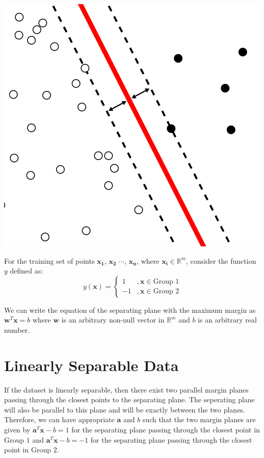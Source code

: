 \documentclass[12 pt]{report}
\begin{document}
    \includegraphics[scale = 1.2]{margin.png}

    For the training set of points $\bm{x_{1}}$, $\bm{x_{2}}$ $\cdots$, $\bm{x_{n}}$, where $\bm{x_{i}} \in \mathbb{R}^{m}$, consider the function 
    $y$ defined as:
    \begin{equation}
        y(\bm{x}) = \begin{cases}
            1 &, \bm{x} \in \text{Group 1} \\
            -1 &, \bm{x} \in \text{Group 2}
        \end{cases}
    \end{equation}

    We can write the equation of the separating plane with the maximum margin as $\bm{w}^{T}\bm{x} = b$ where $\bm{w}$ is an arbitrary non-null vector in 
    $\mathbb{R}^{m}$ and $b$ is an arbitrary real number.

    \section{Linearly Separable Data}
    If the dataset is linearly separable, then there exist two parallel margin planes passing through the closest points to the separating plane.
    The seperating plane will also be parallel to this plane and will be exactly between the two planes. Therefore, we can have appropriate $\bm{a}$ 
    and $b$ such that the two margin planes are given by $\bm{a}^{T}\bm{x} - b = 1$ for the separating plane passing through the closest point in 
    Group $1$ and $\bm{a}^{T}\bm{x} - b = -1$ for the separating plane passing through the closest point in Group $2$.
\end{document}
